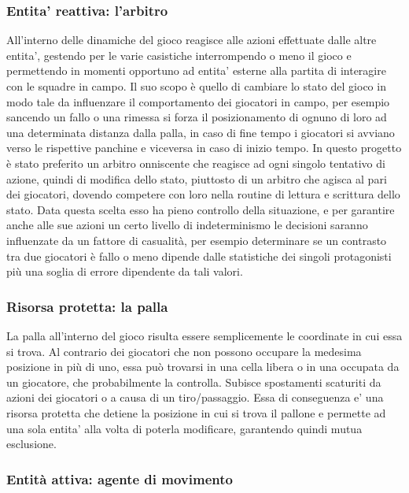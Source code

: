 \subsubsection{Entita' reattiva: l'arbitro}
\label{sec:entita_coinvolte_arbitro}

All'interno delle dinamiche del gioco reagisce alle azioni effettuate dalle altre entita', gestendo per le varie casistiche interrompendo o meno il gioco e permettendo in momenti opportuno ad entita' esterne alla partita di interagire con le squadre in campo. Il suo scopo è quello di cambiare lo stato del gioco in modo tale da influenzare il comportamento dei giocatori in campo, per esempio sancendo un fallo o una rimessa si forza il posizionamento di ognuno di loro ad una determinata distanza dalla palla, in caso di fine tempo i giocatori si avviano verso le rispettive panchine e viceversa in caso di inizio tempo. In questo progetto è stato preferito un arbitro onniscente che reagisce ad ogni singolo tentativo di azione, quindi di modifica dello stato, piuttosto di un arbitro che agisca al pari dei giocatori, dovendo competere con loro nella routine di lettura e scrittura dello stato. Data questa scelta esso ha pieno controllo della situazione, e per garantire anche alle sue azioni un certo livello di indeterminismo le decisioni saranno influenzate da un fattore di casualità, per esempio determinare se un contrasto tra due giocatori è fallo o meno dipende dalle statistiche dei singoli protagonisti più una soglia di errore dipendente da tali valori.

\subsubsection{Risorsa protetta: la palla}
\label{sec:entita_coinvolte_palla}

La palla all'interno del gioco risulta essere semplicemente le coordinate in cui essa si trova. Al contrario dei giocatori che non possono occupare la medesima posizione in più di uno, essa può trovarsi in una cella libera o in una occupata da un giocatore, che probabilmente la controlla. Subisce spostamenti scaturiti da azioni dei giocatori o a causa di un tiro/passaggio. Essa di conseguenza e' una risorsa protetta che detiene la posizione in cui si trova il pallone e permette ad una sola entita' alla volta di poterla modificare, garantendo quindi mutua esclusione.

\subsubsection{Entità attiva: agente di movimento}
\label{sec:entita_coinvolte_agente}

